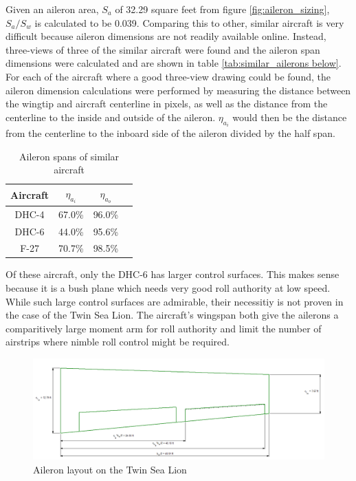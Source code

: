 \documentclass[conf]{new-aiaa}
\begin{document}
Given an aileron area, $S_a$ of 32.29 square feet from figure \ref{fig:aileron_sizing}, $S_a/S_w$ is calculated to be 0.039. Comparing this to other, similar aircraft is very difficult because aileron dimensions are not readily available online. Instead, three-views of three of the similar aircraft were found and the aileron span dimensions were calculated and are shown in table \ref{tab:similar_ailerons below}. For each of the aircraft where a good three-view drawing could be found, the aileron dimension calculations were performed by measuring the distance between the wingtip and aircraft centerline in pixels, as well as the distance from the centerline to the inside and outside of the aileron. $\eta_{a_i}$ would then be the distance from the centerline to the inboard side of the aileron divided by the half span.

\begin{table}[H]
\centering
\caption{Aileron spans of similar aircraft}
\begin{tabular}{|c|c|c|c|}\hline
    Aircraft & $\eta_{a_i}$ & $\eta_{a_o}$ \\ \hline
    DHC-4 & 67.0\%          & 96.0\%        \\ \hline
    DHC-6 & 44.0\%          & 95.6\%        \\ \hline
    F-27  & 70.7\%          & 98.5\%        \\ \hline
\end{tabular}
\label{tab:similar_ailerons}
\end{table}

Of these aircraft, only the DHC-6 has larger control surfaces. This makes sense because it is a bush plane which needs very good roll authority at low speed. While such large control surfaces are admirable, their necessitiy is not proven in the case of the Twin Sea Lion. The aircraft's wingspan both give the ailerons a comparitively large moment arm for roll authority and limit the number of airstrips where nimble roll control might be required.


\begin{figure}[H]
    \includegraphics[width=\textwidth]{Report3Printouts/Wing_and_Aileron/aileron_sizing_plot.png}
    \caption{Aileron layout on the Twin Sea Lion}
    \label{fig:aileron_sizing_plot}
\end{figure}
\end{document}
